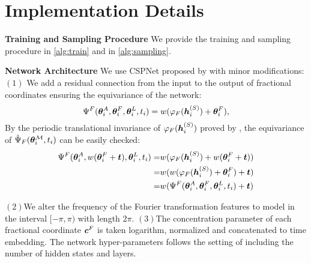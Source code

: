 

\section{Implementation Details}\label{appd:imple_details}

\textbf{Training and Sampling Procedure} We provide the training and sampling procedure in \cref{alg:train} and in \cref{alg:sampling}. 

\textbf{Network Architecture} We use CSPNet proposed by \citet{jiao2023crystal} with minor modifications: $(1)$ We add a residual connection from the input to the output of fractional coordinates ensuring the equivariance of the network:
\begin{equation}
\Psi^F(\bm{\theta}^A_i,\bm{\theta}^F_i,\bm{\theta}^L_i,t_i) = w(\varphi_F({\bm{h}}_i^{(S)})+\bm{\theta}^F_i),
\end{equation}
By the periodic translational invariance of $\varphi_F({\bm{h}}_i^{(S)})$ proved by \citet{jiao2023crystal}, the equivariance of $\hat{\Psi}_F(\bm{\theta}^\mathcal{M}_{i}, t_{i})$ can be easily checked:
\begin{align*}
   \Psi^F(\bm{\theta}^A_i,w(\bm{\theta}^F_i+{\bm{t}}),\bm{\theta}^L_i,t_i)= &w(\varphi_F({\bm{h}}_i^{(S)})+w(\bm{\theta}^F_i+{\bm{t}})) \\
   =& w(w(\varphi_F({\bm{h}}_i^{(S)})+\bm{\theta}^F_i)+{\bm{t}}) \\
   =& w(\Psi^F(\bm{\theta}^A_i,\bm{\theta}^F_i,\bm{\theta}^L_i,t_i)+{\bm{t}})
\end{align*}

$(2)$We alter the frequency of the Fourier transformation features to model in the interval $[-\pi,\pi)$ with length $2\pi$. $(3)$The concentration parameter of each fractional coordinate $\bm{c}^F$ is taken logarithm, normalized and concatenated to time embedding. The network hyper-parameters follows the setting of \citet{jiao2023crystal} including the number of hidden states and layers. 


